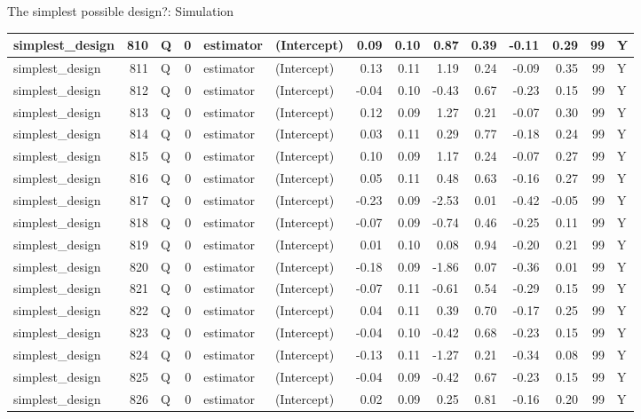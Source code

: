 \documentclass[
  11pt,
  ignorenonframetext,
]{beamer}
\begin{document}
\begin{frame}[fragile]{The simplest possible design?: Simulation}
\begin{tabular}{l|r|l|r|l|l|r|r|r|r|r|r|r|l}
\hline
simplest\_design & 810 & Q & 0 & estimator & (Intercept) & 0.09 & 0.10 & 0.87 & 0.39 & -0.11 & 0.29 & 99 & Y\\
\hline
simplest\_design & 811 & Q & 0 & estimator & (Intercept) & 0.13 & 0.11 & 1.19 & 0.24 & -0.09 & 0.35 & 99 & Y\\
\hline
simplest\_design & 812 & Q & 0 & estimator & (Intercept) & -0.04 & 0.10 & -0.43 & 0.67 & -0.23 & 0.15 & 99 & Y\\
\hline
simplest\_design & 813 & Q & 0 & estimator & (Intercept) & 0.12 & 0.09 & 1.27 & 0.21 & -0.07 & 0.30 & 99 & Y\\
\hline
simplest\_design & 814 & Q & 0 & estimator & (Intercept) & 0.03 & 0.11 & 0.29 & 0.77 & -0.18 & 0.24 & 99 & Y\\
\hline
simplest\_design & 815 & Q & 0 & estimator & (Intercept) & 0.10 & 0.09 & 1.17 & 0.24 & -0.07 & 0.27 & 99 & Y\\
\hline
simplest\_design & 816 & Q & 0 & estimator & (Intercept) & 0.05 & 0.11 & 0.48 & 0.63 & -0.16 & 0.27 & 99 & Y\\
\hline
simplest\_design & 817 & Q & 0 & estimator & (Intercept) & -0.23 & 0.09 & -2.53 & 0.01 & -0.42 & -0.05 & 99 & Y\\
\hline
simplest\_design & 818 & Q & 0 & estimator & (Intercept) & -0.07 & 0.09 & -0.74 & 0.46 & -0.25 & 0.11 & 99 & Y\\
\hline
simplest\_design & 819 & Q & 0 & estimator & (Intercept) & 0.01 & 0.10 & 0.08 & 0.94 & -0.20 & 0.21 & 99 & Y\\
\hline
simplest\_design & 820 & Q & 0 & estimator & (Intercept) & -0.18 & 0.09 & -1.86 & 0.07 & -0.36 & 0.01 & 99 & Y\\
\hline
simplest\_design & 821 & Q & 0 & estimator & (Intercept) & -0.07 & 0.11 & -0.61 & 0.54 & -0.29 & 0.15 & 99 & Y\\
\hline
simplest\_design & 822 & Q & 0 & estimator & (Intercept) & 0.04 & 0.11 & 0.39 & 0.70 & -0.17 & 0.25 & 99 & Y\\
\hline
simplest\_design & 823 & Q & 0 & estimator & (Intercept) & -0.04 & 0.10 & -0.42 & 0.68 & -0.23 & 0.15 & 99 & Y\\
\hline
simplest\_design & 824 & Q & 0 & estimator & (Intercept) & -0.13 & 0.11 & -1.27 & 0.21 & -0.34 & 0.08 & 99 & Y\\
\hline
simplest\_design & 825 & Q & 0 & estimator & (Intercept) & -0.04 & 0.09 & -0.42 & 0.67 & -0.23 & 0.15 & 99 & Y\\
\hline
simplest\_design & 826 & Q & 0 & estimator & (Intercept) & 0.02 & 0.09 & 0.25 & 0.81 & -0.16 & 0.20 & 99 & Y\\

\end{tabular}
\end{frame}
\end{document}
